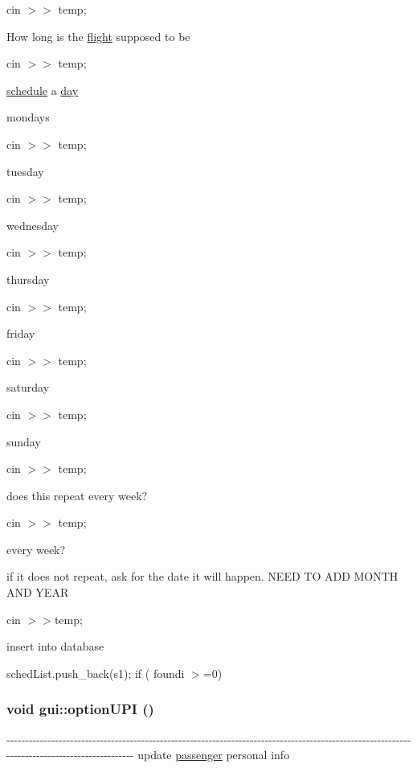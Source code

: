 cin $>$$>$ temp;

How long is the \hyperlink{classflight}{flight} supposed to be

cin $>$$>$ temp;

\hyperlink{classschedule}{schedule} a \hyperlink{classday}{day}

mondays

cin $>$$>$ temp;

tuesday

cin $>$$>$ temp;

wednesday

cin $>$$>$ temp;

thursday

cin $>$$>$ temp;

friday

cin $>$$>$ temp;

saturday

cin $>$$>$ temp;

sunday

cin $>$$>$ temp;

does this repeat every week?

cin $>$$>$ temp;

every week?

if it does not repeat, ask for the date it will happen. NEED TO ADD MONTH AND YEAR

cin $>$$>$temp;

insert into database

schedList.push\_\-back(s1); if ( foundi $>$=0) \hypertarget{classgui_ad5b000e91b8802954731689d9d9a4bd7}{
\subsubsection[{optionUPI}]{\setlength{\rightskip}{0pt plus 5cm}void gui::optionUPI ()}}
\label{classgui_ad5b000e91b8802954731689d9d9a4bd7}
-\/-\/-\/-\/-\/-\/-\/-\/-\/-\/-\/-\/-\/-\/-\/-\/-\/-\/-\/-\/-\/-\/-\/-\/-\/-\/-\/-\/-\/-\/-\/-\/-\/-\/-\/-\/-\/-\/-\/-\/-\/-\/-\/-\/-\/-\/-\/-\/-\/-\/-\/-\/-\/-\/-\/-\/-\/-\/-\/-\/-\/-\/-\/-\/-\/-\/-\/-\/-\/-\/-\/-\/-\/-\/-\/-\/-\/-\/-\/-\/-\/-\/-\/-\/-\/-\/-\/-\/-\/-\/-\/-\/-\/-\/-\/-\/-\/-\/-\/-\/-\/-\/-\/-\/-\/-\/-\/-\/-\/-\/-\/-\/-\/-\/-\/-\/-\/-\/-\/-\/-\/-\/-\/-\/-\/-\/-\/-\/-\/-\/-\/-\/-\/-\/-\/-\/-\/-\/-\/-\/-\/-\/ update \hyperlink{classpassenger}{passenger} personal info 

